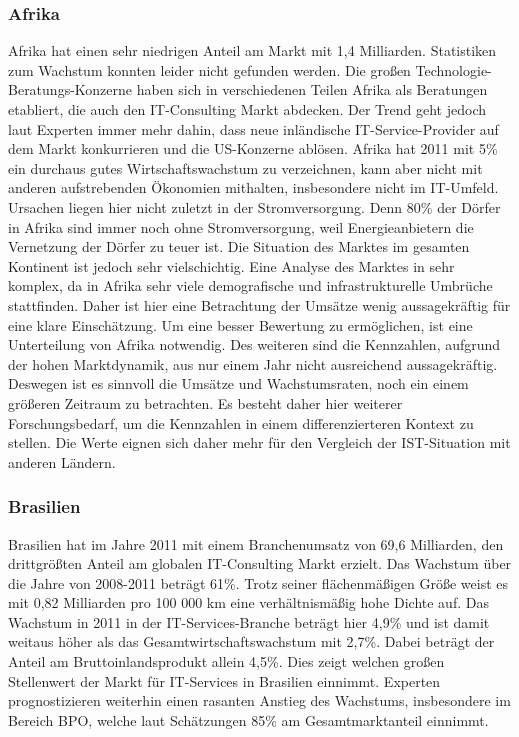 \subsubsection*{Afrika}

Afrika hat einen sehr niedrigen Anteil am Markt mit 1,4 Milliarden. \cite{statAfr} Statistiken zum Wachstum konnten leider nicht gefunden werden. Die großen Technologie-Beratungs-Konzerne haben sich in verschiedenen Teilen Afrika als Beratungen etabliert, die auch den IT-Consulting Markt abdecken. Der Trend geht jedoch laut Experten immer mehr dahin, dass neue inländische IT-Service-Provider auf dem Markt konkurrieren und die US-Konzerne ablösen. Afrika hat 2011 mit 5\% ein durchaus gutes Wirtschaftswachstum zu verzeichnen, kann aber nicht mit anderen aufstrebenden Ökonomien mithalten, insbesondere nicht im IT-Umfeld. \cite{statAfr2}
Ursachen liegen hier nicht zuletzt in der Stromversorgung. Denn 80\% der Dörfer in Afrika sind immer noch ohne Stromversorgung, weil Energieanbietern die Vernetzung der Dörfer zu teuer ist.  \cite{dieZeit}
Die Situation des Marktes im gesamten Kontinent ist jedoch sehr vielschichtig. Eine Analyse des Marktes in sehr komplex, da in Afrika sehr viele demografische und infrastrukturelle Umbrüche stattfinden. Daher ist hier eine Betrachtung der Umsätze wenig aussagekräftig für eine klare Einschätzung. 
Um eine besser Bewertung zu ermöglichen, ist eine Unterteilung von Afrika notwendig. Des weiteren sind die Kennzahlen, aufgrund der hohen Marktdynamik, aus nur einem Jahr nicht ausreichend aussagekräftig. Deswegen ist es sinnvoll die Umsätze und Wachstumsraten, noch ein einem größeren Zeitraum zu betrachten.
Es besteht daher hier weiterer Forschungsbedarf, um die Kennzahlen in einem differenzierteren Kontext zu stellen.
Die Werte eignen sich daher mehr für den Vergleich der IST-Situation mit anderen Ländern.

\subsubsection* {Brasilien}

Brasilien hat im Jahre 2011 mit einem Branchenumsatz von 69,6 Milliarden, den drittgrößten Anteil am globalen IT-Consulting Markt erzielt. Das Wachstum über die Jahre von 2008-2011 beträgt 61\%. \cite{statBras2} Trotz seiner flächenmäßigen Größe weist es mit 0,82 Milliarden pro 100 000 km eine verhältnismäßig hohe Dichte auf. Das Wachstum in 2011 in der IT-Services-Branche beträgt hier 4,9\% und ist damit weitaus höher als das Gesamtwirtschaftswachstum mit 2,7\%. Dabei beträgt der Anteil am Bruttoinlandsprodukt allein 4,5\%. Dies zeigt welchen großen Stellenwert der Markt für IT-Services in Brasilien einnimmt. Experten prognostizieren weiterhin einen rasanten Anstieg des Wachstums, insbesondere im Bereich BPO, welche laut Schätzungen 85\% am Gesamtmarktanteil einnimmt.\cite{statBras}

